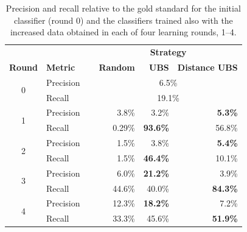 \begin{table}[ht!]
\centering
\caption{Precision and recall relative to the gold standard for
the initial classifier (round 0) and the classifiers trained also with the increased data obtained in each of
four learning rounds, 1--4.\label{tab:pr_table}
}
\vspace{2ex}
\setlength\tabcolsep{6pt}
\begin{tabular}{|c| l | r | r | r |}
\hline
& & \multicolumn{3}{c|}{\textbf{Strategy}} \\
 \textbf{Round} & \textbf{Metric} & \textbf{Random} & \textbf{UBS}  & \textbf{Distance UBS}  \\
\hline
\multirow{2}{*}{0} & Precision &        \multicolumn{3}{c|}{6.5\%} \\
 & Recall\ \ \ \ \ &               \multicolumn{3}{c|}{19.1\%} \\
\hline
\multirow{2}{*}{1}  & Precision     & 3.8\%       &      3.2\%      &  \textbf{5.3\%} \\
 & Recall\ \ \ \ \ & 0.29\%      &   \textbf{93.6\%}     &  56.8\% \\
\hline
\multirow{2}{*}{2} & Precision      & 1.5\%           &      3.8\%      &  \textbf{5.4\%} \\
& Recall\ \ \ \ \ & 1.5\%           &    \textbf{46.4\%}      &  10.1\% \\
\hline
\multirow{2}{*}{3}  & Precision      & 6.0\%              &    \textbf{21.2\%}      &  3.9\% \\
 & Recall\ \ \ \ \ & 44.6\%            &    40.0\%      &  \textbf{84.3\%}  \\
\hline
\multirow{2}{*}{4} & Precision     & 12.3\%          &    \textbf{18.2\%}      &  7.2\% \\
& Recall\ \ \ \ \ & 33.3\%         &     45.6\%     &  \textbf{51.9\%} \\
\hline
\end{tabular}
\end{table}

